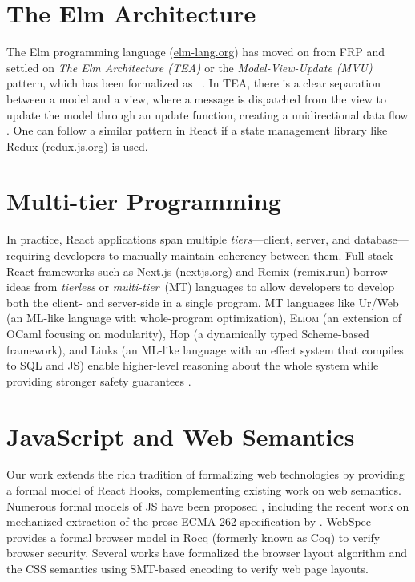 \section{The Elm Architecture}
The Elm programming language (\href{https://elm-lang.org/}{elm-lang.org}) has moved on from FRP and settled on \emph{The Elm Architecture (TEA)} or the \emph{Model-View-Update (MVU)} pattern, which has been formalized as~\Lmvu{} \citep{Fow20ModelViewUpdateCommunicate}.
In TEA, there is a clear separation between a model and a view, where a message is dispatched from the view to update the model through an update function, creating a unidirectional data flow \citep{Fel20Elm}.
One can follow a similar pattern in React if a state management library like Redux (\href{https://redux.js.org/}{redux.js.org}) is used.

\section{Multi-tier Programming}
In practice, React applications span multiple \emph{tiers}---client, server, and database---requiring developers to manually maintain coherency between them.
Full stack React frameworks such as Next.js (\href{https://nextjs.org/}{nextjs.org}) and Remix (\href{https://remix.run/}{remix.run}) borrow ideas from \emph{tierless} or \emph{multi-tier}~(MT) languages to allow developers to develop both the client- and server-side in a single program.
MT languages like Ur/Web \citep{Chl15UrWeb,Chl15Optimizing} (an ML-like language with whole-program optimization), \textsc{Eliom} \citep{RadVouBal16Eliom,RadPapVouBal16Eliom} (an extension of OCaml focusing on modularity), Hop \citep{SerGalLoi06Hop,BouLuoRezSer12Reasoning} (a dynamically typed Scheme-based framework), and Links \citep{CooLinWadYal07Links} (an ML-like language with an effect system that compiles to SQL and JS) enable higher-level reasoning about the whole system while providing stronger safety guarantees \citep{WeiWirSal21Survey}.

\section{JavaScript and Web Semantics}
Our work extends the rich tradition of formalizing web technologies by providing a formal model of React Hooks, complementing existing work on web semantics.
Numerous formal models of JS have been proposed \citep{GuhSafKri10Essence,MafMitTal08Operational,ParSteAndRos15KJS,PolCarLerPomKri12Tested,FraMakNauWooGar18JaVerT,MadLhoTip17Model}, including the recent work on mechanized extraction of the prose ECMA-262 specification by \citet{ParParAnRyu21JISET}.
WebSpec \citep{VerFarBerTemSquMaf23WebSpec} provides a formal browser model in Rocq (formerly known as Coq) to verify browser security.
Several works \citep{PanTor16Automated,PanErnTatKam19Modular,PanGelErnTatKam18Verifying} have formalized the browser layout algorithm and the CSS semantics using SMT-based encoding to verify web page layouts.
